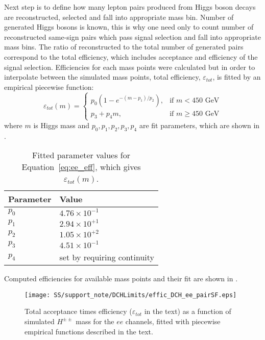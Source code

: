 Next step is to define how many lepton pairs produced from Higgs boson decays are reconstructed, selected and fall into appropriate mass bin.
Number of generated Higgs bosons is known, this is why one need only to count number of reconstructed same-sign pairs which pass signal selection and fall into appropriate mass bins.
The ratio of reconstructed to the total number of generated pairs correspond to the total efficiency, which includes acceptance and efficiency of the signal selection.
Efficiencies for each mass points were calculated but in order to interpolate between the simulated mass points, total efficiency, $\varepsilon_{tot}$, is fitted by
an empirical piecewise function:
\begin{equation}
\varepsilon_{tot}(m) = \begin{cases} p_{0} (1-e^{-(m-p_{1})/p_{2}}), & \mbox{if } m < 450\mbox{ GeV} \\ 
p_{3} + p_{4} m, & \mbox{if } m \geq 450\mbox{ GeV} \end{cases}
\label{eq:ee_eff}
\end{equation}
where $m$ is Higgs mass and $p_{0}, p_{1}, p_{2}, p_{3}, p_{4}$ are fit parameters, which are shown in .
\begin{table}[htbp]
    \caption{Fitted parameter values for Equation~\ref{eq:ee_eff}, which gives $\varepsilon_{tot}(m)$.}
    \begin{center}
    \begin{tabular}{ l | l }
        \hline
        Parameter & Value \\
        \hline
        $p_{0}$    & $4.76 \times 10^{-1}$ \\[+0.05in]
        $p_{1}$    & $2.94 \times 10^{+1}$ \\[+0.05in]
        $p_{2}$    & $1.05 \times 10^{+2}$ \\[+0.05in]
        $p_{3}$    & $4.51 \times 10^{-1}$ \\[+0.05in]
        $p_{4}$    & set by requiring continuity \\[+0.05in]
        \hline
    \end{tabular}
    \end{center}
    \label{tab:ee_eff_params}
\end{table}

Computed efficiencies for available mass points and their fit are shown in .

\begin{figure}[h]
\begin{center}
\texttt{[image: SS/support\_note/DCHLimits/effic\_DCH\_ee\_pairSF.eps]}
\caption{\toDo Total acceptance times efficiency ($\varepsilon_{tot}$ in the text) as a function of simulated $H^{\pm\pm}$ mass for the $ee$ channels, 
fitted with piecewise empirical functions described in the text.}
\label{fig:signal_efficiency}
\end{center}
\end{figure}

